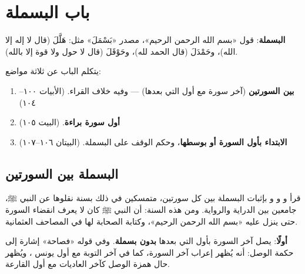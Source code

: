 \chapter{باب البسملة}

\textbf{البسملة}: قول «بسم الله الرحمن الرحيم»، مصدر «بَسْمَلَ» مثل: هَلَّلَ (قال لا إله إلا الله)، وحَمْدَلَ (قال الحمد لله)، وحَوْقَلَ (قال لا حول ولا قوة إلا بالله).

يتكلم الباب عن ثلاثة مواضع:
\begin{enumerate}
\item \textbf{بين السورتين} (آخر سورة مع أول التي بعدها) — وفيه خلاف القراء. \hfill (الأبيات ١٠٠–١٠٤)
\item \textbf{أول سورة براءة}. \hfill (البيت ١٠٥)
\item \textbf{الابتداء بأول السورة أو بوسطها}، وحكم الوقف على البسملة. \hfill (البيتان ١٠٦–١٠٧)
\end{enumerate}

\section{البسملة بين السورتين}

\begin{mufradat}
\end{mufradat}
\maana قرأ \Qalun{} و\Kisai{} و\Asim{} و\IbnKathir{} بإثبات البسملة بين كل سورتين، متمسكين في ذلك بسنة نقلوها عن النبي ﷺ، جامعين بين الدراية والرواية.
ومن هذه السنة: أن النبي ﷺ كان لا يعرف انقضاء السورة حتى ينزل عليه «بسم الله الرحمن الرحيم»، وكتابة الصحابة لها في المصاحف العثمانية.

\begin{mufradat}
\end{mufradat}
\maana
\textbf{أولًا}: \Hamza{} يصل آخر السورة بأول التي بعدها \textbf{بدون بسملة}. وفي قوله «فصاحة» إشارة إلى حكمة الوصل: أنه يُظهر إعراب آخر السورة، كما في آخر التوبة مع أول يونس ، ويُظهر حال همزة الوصل كآخر العاديات مع أول القارعة.


